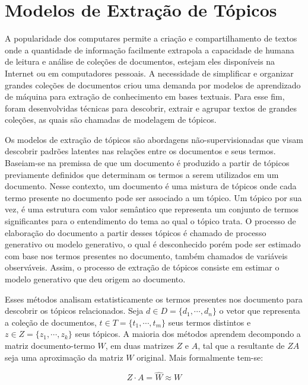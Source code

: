 \section{Modelos de Extração de Tópicos}

A popularidade dos computares permite a criação e compartilhamento de textos onde a quantidade de informação facilmente extrapola a capacidade de humana de leitura e análise de coleções de documentos, estejam eles disponíveis na Internet ou em computadores pessoais. A necessidade de simplificar e organizar grandes coleções de documentos criou uma demanda por modelos de aprendizado de máquina para extração de conhecimento em bases textuais. Para esse fim, foram desenvolvidas técnicas para descobrir, extrair e agrupar textos de grandes coleções, as quais são chamadas de modelagem de tópicos.

Os modelos de extração de tópicos são abordagens não-supervisionadas que visam descobrir padrões latentes nas relações entre os documentos e seus termos.  Baseiam-se na premissa de que um documento é produzido a partir de tópicos previamente definidos que determinam os termos a serem utilizados em um documento. Nesse contexto, um documento é uma mistura de tópicos onde cada termo presente no documento pode ser associado a um tópico. Um tópico por sua vez, é uma estrutura com valor semântico que representa um conjunto de termos significantes para o entendimento do tema ao qual o tópico trata. O processo de elaboração do documento a partir desses tópicos é chamado de processo generativo ou modelo generativo, o qual é desconhecido porém pode ser estimado com base nos termos presentes no documento, também chamados de variáveis observáveis. Assim, o processo de extração de tópicos consiste em estimar o modelo generativo que deu origem ao documento.


Esses métodos analisam estatisticamente os termos presentes nos documento para descobrir os tópicos relacionados. Seja 
$d \in D = \{d_1,\cdots,d_n\}$ o vetor que representa a coleção de documentos, 
$t \in T = \{t_1,\cdots,t_m\}$ seus termos distintos e 
$z \in Z = \{z_1,\cdots,z_k\}$ seus tópicos. 
A maioria dos métodos aprendem decompondo a matriz documento-termo $W$, em duas matrizes $Z$ e $A$, tal que a resultante de $ZA$ seja uma aproximação da matriz $W$ original. Mais formalmente tem-se:

\begin{equation}
	Z\cdot A = \hat{W} \approx W
\end{equation}

